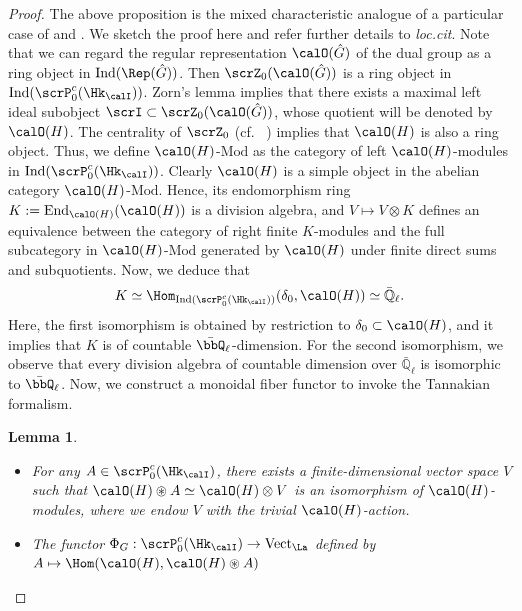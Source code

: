\documentclass[10pt, reqno]{amsart}
\theoremstyle{plain}
\newtheorem{lemma}[theorem]{Lemma}
\theoremstyle{definition}
\numberwithin{equation}{section}
\begin{document}
\begin{proof}
	The above proposition is the mixed characteristic analogue of a particular case of \cite[Proposition 1, Theorem 3]{Bez04} and \cite[Proposition 6.5.18]{AR}. We sketch the proof here and refer further details to \textit{loc.cit}. Note that we can regard the regular representation $\calO(\hat{G})$ of the dual group as a ring object in $\mathrm{Ind}(\Rep(\hat{G}))$. %
	Then $\scrZ_0(\calO(\hat{G}))$ is a ring object in $\mathrm{Ind}(\scrP_0^c(\Hk_{\calI}))$. Zorn's lemma implies that there exists a maximal left ideal subobject $ \scrI \subset \scrZ_0(\calO(\hat{G}))$, whose quotient will be denoted by $\calO(H)$. The centrality of $\scrZ_0$ (cf. \ ) implies that $\calO(H)$ is also a ring object. Thus, we define $\calO(H)$-$\mathrm{Mod}$ as the category of left $\calO(H)$-modules in $\mathrm{Ind}(\scrP_0^c(\Hk_{\calI}))$. Clearly $\calO(H)$ is a simple object in the abelian category $\calO(H)$-$\mathrm{Mod}$. Hence, its endomorphism ring $K:=\mathrm{End}_{\calO(H) }(\calO(H))$ is a division algebra, and $V\mapsto V\otimes K$ defines an equivalence between the category of right finite $K$-modules and the full subcategory in $\calO(H)$-$\mathrm{Mod}$ generated by $\calO(H)$ under finite direct sums and subquotients. Now, we deduce that 
	\begin{equation}\label{endo_of_ind_objects}
		K\simeq \Hom_{\mathrm{Ind}(\scrP_0^c(\Hk_{\calI}))}(\delta_0,\calO(H))\simeq \bar{\mathbb{Q}}_\ell.
	\end{equation}
	Here, the first isomorphism is obtained by restriction to $\delta_0\subset \calO(H)$, and it implies that $K$ is of countable $\bar \bbQ_{\ell}$-dimension. For the second isomorphism, we observe that every division algebra of countable dimension over $\bar{\mathbb{Q}}_{\ell}$ is isomorphic to $\bar \bbQ_\ell$.
	Now, we construct a monoidal fiber functor to invoke the Tannakian formalism.
	\begin{lemma}\label{prep_Tannakian}
		\begin{itemize}
			\item[(1)] For any $A\in \scrP_0^c(\Hk_{\calI})$, there exists a finite-dimensional vector space $V$ such that $\calO(H)\circledast A\simeq \calO(H)\otimes V$ is an isomorphism of $\calO(H)$-modules, where we endow $V$ with the trivial $\calO(H)$-action.
			\item [(2)] The functor $\Phi_G:\scrP_0^c(\Hk_{\calI})\rightarrow \mathrm{Vect}_{\La}$ defined by $A\mapsto \Hom(\calO(H),\calO(H)\circledast A)$

\end{itemize}
\end{lemma}
\end{proof}
\end{document}
